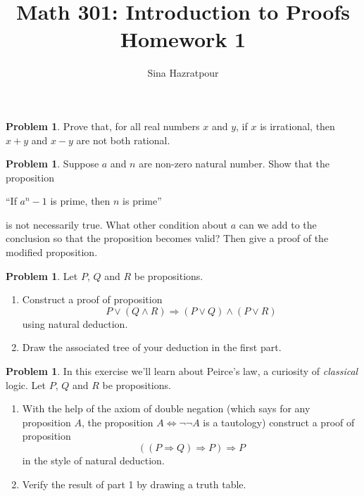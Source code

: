 \documentclass[12pt,english]{amsart}
\title{Math 301: Introduction to Proofs\\
Homework 1}
\author[]{Sina Hazratpour}
\theoremstyle{plain}
\theoremstyle{definition}
\theoremstyle{plain}
\theoremstyle{plain}
\theoremstyle{remark}
\newcounter{problems}
\theoremstyle{definition}
\newtheorem{problem}[problems]{Problem}
\theoremstyle{remark}
\newtheorem*{solution}{Solution}
\renewcommand{\implies}{\Rightarrow}
\newcommand{\biimplies}{\ensuremath{\Leftrightarrow}}
\begin{document}
\maketitle




\begin{problem}
	Prove that, for all real numbers $x$ and $y$, if $x$ is irrational, then $x+y$ and $x-y$ are not both rational.
\end{problem}



%	



\begin{problem}
Suppose $a$ and $n$ are non-zero natural number. 
Show that the proposition 
\begin{center}
    ``If $a^n - 1 $ is prime, then $n$ is prime''
\end{center}
is not necessarily true. 
What other condition about $a$ can we add to the conclusion so that the proposition becomes valid? Then give a proof of the modified proposition.
\end{problem}



\begin{problem}
Let $P$, $Q$ and $R$ be propositions. 
\begin{enumerate}  
    \item Construct a proof of proposition
	$$P\vee (Q \wedge R) \Rightarrow (P\vee Q)\wedge (P\vee R)$$
	using natural deduction. 
	\item Draw the associated tree of your deduction in the first part.
\end{enumerate}
\end{problem}

	



\begin{problem}
In this exercise we’ll learn about Peirce’s law, a curiosity of \emph{classical} logic.
Let $P$, $Q$ and $R$ be propositions.  \leavevmode 
\begin{enumerate}
    \item With the help of 
    the axiom of double negation  (which says for any proposition $A$, the proposition $A \biimplies \neg \neg A$ is a tautology) 
    construct a proof of proposition $$ ((P \implies Q) \implies P) \implies P $$ 
    in the style of natural deduction. 
    \item Verify the result of part 1 by drawing a truth table.  
\end{enumerate}
\end{problem}
\end{document}

